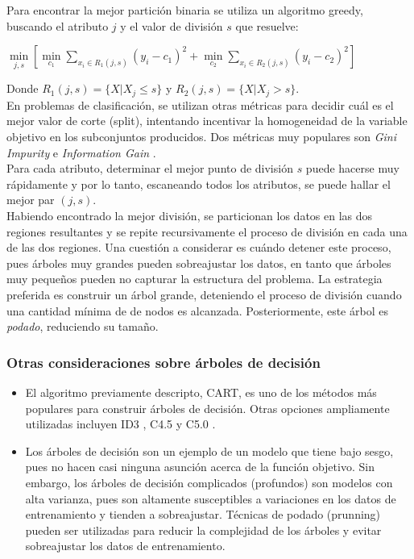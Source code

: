 Para encontrar la mejor partición binaria se utiliza un algoritmo greedy, buscando el atributo $j$ y el valor de división $s$ que resuelve:

\begin{center}
$ \min\limits_{j,s}[ \min\limits_{c_1} \sum\limits_{x_i \in R_1(j,s)} (y_i - c_1)^2 + 	\min\limits_{c_2} \sum\limits_{x_i \in R_2(j,s)} (y_i - c_2)^2  ]$
\end{center}

Donde $R_1(j,s) = \{ X | X_j \leq s \}$ y $R_2(j,s) = \{ X | X_j > s \}$. \\

En problemas de clasificación, se utilizan otras métricas para decidir cuál es el mejor valor de corte (split), intentando incentivar la homogeneidad de la variable objetivo en los subconjuntos producidos. Dos métricas muy populares son \textit{Gini Impurity} e \textit{Information Gain} \cite{ginigain}.\\

Para cada atributo, determinar el mejor punto de división $s$ puede hacerse muy rápidamente y por lo tanto, escaneando todos los atributos, se puede hallar el mejor par $(j,s)$. \\

Habiendo encontrado la mejor división, se particionan los datos en las dos regiones resultantes y se repite recursivamente el proceso de división en cada una de las dos regiones. Una cuestión a considerar es cuándo detener este proceso, pues árboles muy grandes pueden sobreajustar los datos, en tanto que árboles muy pequeños pueden no capturar la estructura del problema. La estrategia preferida es construir un árbol grande, deteniendo el proceso de división cuando una cantidad mínima de de nodos es alcanzada. Posteriormente, este árbol es \textit{podado}, reduciendo su tamaño. 


\subsubsection{Otras consideraciones sobre árboles de decisión}

\begin{itemize}
\item El algoritmo previamente descripto, CART, es uno de los métodos más populares para construir árboles de decisión. Otras opciones ampliamente utilizadas incluyen ID3 \cite{id3}, C4.5 \cite{c45} y C5.0 \cite{noauthororeditor2013applied}.
\item Los árboles de decisión son un ejemplo de un modelo que tiene bajo sesgo, pues no hacen casi ninguna asunción acerca de la función objetivo. Sin embargo, los árboles de decisión complicados (profundos) son modelos con alta varianza, pues son altamente susceptibles a variaciones en los datos de entrenamiento y tienden a sobreajustar. Técnicas de podado (prunning) pueden ser utilizadas para reducir la complejidad de los árboles y evitar sobreajustar los datos de entrenamiento.
\end{itemize}



